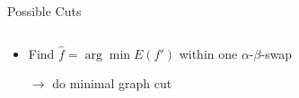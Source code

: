\documentclass[mathserif]{beamer}
\begin{document}
\begin{frame}{Possible Cuts}

    \begin{columns}
        \begin{column}{.5\textwidth}
            \begin{itemize}
                \item Find $\hat f = \arg \min E(f')$ within one $\alpha$-$\beta$-swap 
                \item[$\rightarrow$] do minimal graph cut
            \end{itemize}
        \end{column}
        \begin{column}{.5\textwidth}
            \begin{figure}
                \centering
\end{figure}
\end{column}
\end{columns}
\end{frame}
\end{document}
